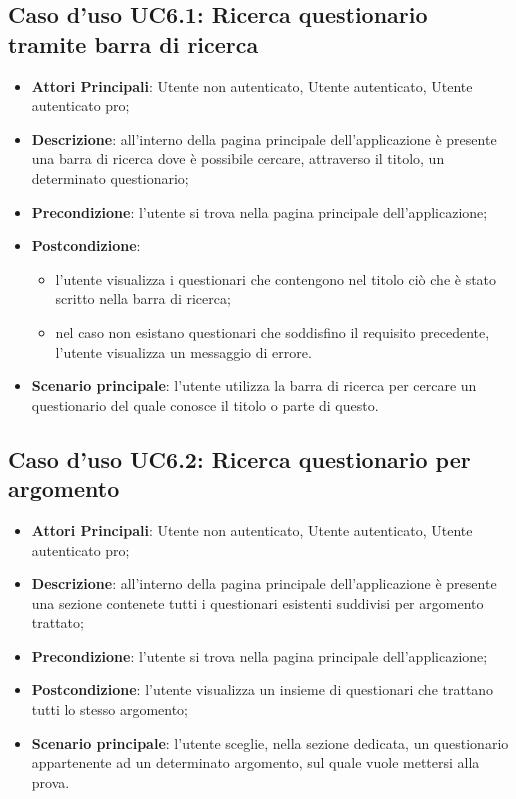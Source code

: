 \subsection{Caso d'uso UC6.1: Ricerca questionario tramite barra di ricerca}
\begin{itemize}
\item\textbf{Attori Principali}: Utente non autenticato, Utente autenticato, Utente autenticato pro;
\item\textbf{Descrizione}: all'interno della pagina principale dell'applicazione è presente una barra di ricerca dove è possibile cercare, attraverso il titolo, un determinato questionario;
\item\textbf{Precondizione}: l'utente si trova nella pagina principale dell'applicazione;
\item\textbf{Postcondizione}:
\begin{itemize}
\item l'utente visualizza i questionari che contengono nel titolo ciò che è stato scritto nella barra di ricerca;
\item nel caso non esistano questionari che soddisfino il requisito precedente, l'utente visualizza un messaggio di errore. 
\end{itemize}
\item\textbf{Scenario principale}: l'utente utilizza la barra di ricerca per cercare un questionario del quale conosce il titolo o parte di questo.
\end{itemize}

\subsection{Caso d'uso UC6.2: Ricerca questionario per argomento}
\begin{itemize}
\item\textbf{Attori Principali}: Utente non autenticato, Utente autenticato, Utente autenticato pro;
\item\textbf{Descrizione}: all'interno della pagina principale dell'applicazione è presente una sezione contenete tutti i questionari esistenti suddivisi per argomento trattato;
\item\textbf{Precondizione}: l'utente si trova nella pagina principale dell'applicazione;
\item\textbf{Postcondizione}: l'utente visualizza un insieme di questionari che trattano tutti lo stesso argomento;
\item\textbf{Scenario principale}: l'utente sceglie, nella sezione dedicata, un questionario appartenente ad un determinato argomento, sul quale vuole mettersi alla prova. 
\end{itemize}

